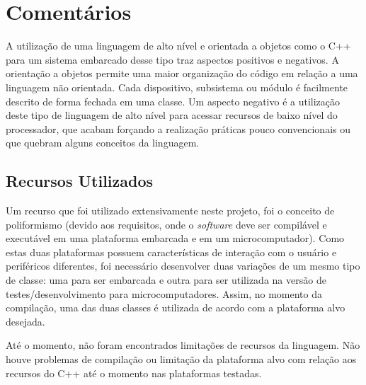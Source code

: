 %
%
%
%
%

%
%
%
%
%

\section{Comentários} \label{sec:comments}

A utilização de uma linguagem de alto nível e orientada a objetos como o C++ para um sistema embarcado desse tipo traz aspectos positivos e negativos. A orientação a objetos permite uma maior organização do código em relação a uma linguagem não orientada. Cada dispositivo, subsistema ou módulo é facilmente descrito de forma fechada em uma classe. Um aspecto negativo é a utilização deste tipo de linguagem de alto nível para acessar recursos de baixo nível do processador, que acabam forçando a realização práticas pouco convencionais ou que quebram alguns conceitos da linguagem.

\subsection{Recursos Utilizados}

Um recurso que foi utilizado extensivamente neste projeto, foi o conceito de poliformismo (devido aos requisitos, onde o \textit{software} deve ser compilável e executável em uma plataforma embarcada e em um microcomputador). Como estas duas plataformas possuem características de interação com o usuário e periféricos diferentes, foi necessário desenvolver duas variações de um mesmo tipo de classe: uma para ser embarcada e outra para ser utilizada na versão de testes/desenvolvimento para microcomputadores. Assim, no momento da compilação, uma das duas classes é utilizada de acordo com a plataforma alvo desejada.

Até o momento, não foram encontrados limitações de recursos da linguagem. Não houve problemas de compilação ou limitação da plataforma alvo com relação aos recursos do C++ até o momento nas plataformas testadas.
